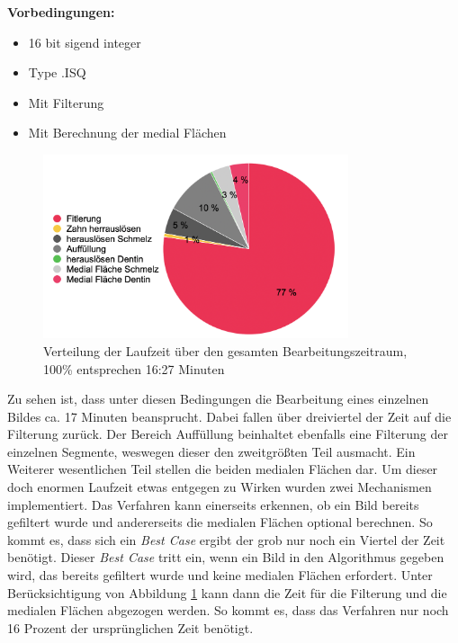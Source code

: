 \textbf{Vorbedingungen:}
\begin{itemize}
	\item 16 bit sigend integer

	\item Type .ISQ

	\item Mit Filterung

	\item Mit Berechnung der medial Flächen
\end{itemize}

\begin{figure}[h]
	\centering
	\includegraphics[width=0.8\textwidth]{img/laufzeit_diagramm.png}
	\caption{Verteilung der Laufzeit über den gesamten Bearbeitungszeitraum, 100\%
	entsprechen 16:27 Minuten}
	\label{fig:laufzeit}
\end{figure}

Zu sehen ist, dass unter diesen Bedingungen die Bearbeitung eines einzelnen
Bildes ca. 17 Minuten beansprucht. Dabei fallen über dreiviertel der Zeit auf
die Filterung zurück. Der Bereich Auffüllung beinhaltet ebenfalls eine Filterung
der einzelnen Segmente, weswegen dieser den zweitgrößten Teil ausmacht. Ein Weiterer
wesentlichen Teil stellen die beiden medialen Flächen dar. Um dieser doch
enormen Laufzeit etwas entgegen zu Wirken wurden zwei Mechanismen implementiert.
Das Verfahren kann einerseits erkennen, ob ein Bild bereits gefiltert wurde und
andererseits die medialen Flächen optional berechnen. So kommt es, dass sich ein
\textit{Best Case} ergibt der grob nur noch ein Viertel der Zeit benötigt.
Dieser \textit{Best Case} tritt ein, wenn ein Bild in den Algorithmus gegeben
wird, das bereits gefiltert wurde und keine medialen Flächen erfordert. Unter
Berücksichtigung von Abbildung \ref{fig:laufzeit} kann dann die Zeit für die
Filterung und die medialen Flächen abgezogen werden. So kommt es, dass das
Verfahren nur noch 16 Prozent der ursprünglichen Zeit benötigt.

